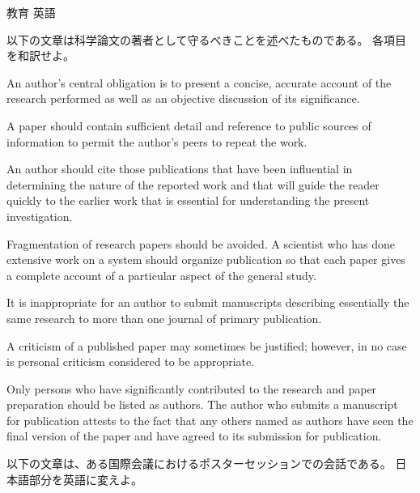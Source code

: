 \documentclass[fleqn]{jbook}
\begin{document}
\begin{question}{教育 英語}{}

\begin{subquestions}
\SubQuestion
  以下の文章は科学論文の著者として守るべきことを述べたものである。
  各項目を和訳せよ。

\baselineskip=12pt
  \begin{subsubquestions}
  \SubSubQuestion
    An author's central obligation is to present a concise,
    accurate account of the research performed as well as an objective
    discussion of its significance.

  \SubSubQuestion
    A paper should contain sufficient detail and reference
    to public sources of information to permit the author's peers to
    repeat the work.

  \SubSubQuestion
    An author should cite those publications that have been influential
    in determining the nature of the reported work and that will guide 
    the reader quickly to the earlier work that is essential for
    understanding the present investigation.

  \SubSubQuestion
    Fragmentation of research papers should be avoided. A scientist
    who has done extensive work on a system should organize 
    publication so that each paper gives a complete account of a
    particular aspect of the general study.
 
  \SubSubQuestion
    It is inappropriate for an author to submit manuscripts describing
    essentially the same research to more than one journal of primary
    publication.

  \SubSubQuestion
    A criticism of a published paper may sometimes be justified;
    however, in no case is personal criticism considered to be
    appropriate.

  \SubSubQuestion
    Only persons who have significantly contributed to the research 
    and paper preparation should be listed as authors. The author
    who submits a manuscript for publication attests to the fact that
    any others named as authors have seen the final version of the
    paper and have agreed to its submission for publication.

  \end{subsubquestions}
\baselineskip=15pt



\SubQuestion
  以下の文章は、ある国際会議におけるポスターセッションでの会話である。
  日本語部分を英語に変えよ。


\end{subquestions}
\end{question}
\end{document}
